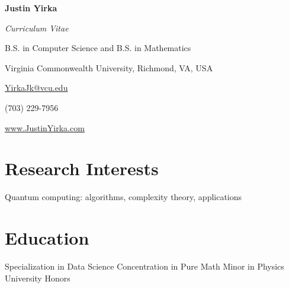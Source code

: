 \documentclass[11pt,letterpaper,serif]{moderncv}
\begin{document}
	
	
\thispagestyle{firstpage}

\begin{center}
	{\huge\textbf{Justin Yirka}}
	
	\textit{Curriculum Vitae}
	
	B.S. in Computer Science and B.S. in Mathematics
	
	Virginia Commonwealth University, Richmond, VA, USA
	\vspace{\baselineskip}
	
	\href{mailto:yirkajk@vcu.edu}{YirkaJk@vcu.edu}
	
	(703) 229-7956
	
	\url{www.JustinYirka.com}	
\end{center}


\setlength{\parskip}{0.5em}
\setlength\bibitemsep{\parskip}


\section{Research Interests}
Quantum computing: algorithms, complexity theory, applications


\section{Education}
\vspace{-\baselineskip}\vspace{-\parskip}
{	
	\begin{adjustwidth}{.25in}{}
		Specialization in Data Science \newline
		Concentration in Pure Math \newline 
		Minor in Physics \newline
		University Honors
	\end{adjustwidth}
}
\end{document}
